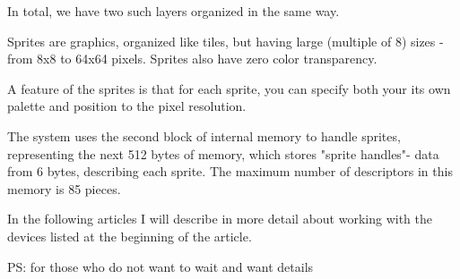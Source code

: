 In total, we have two such layers organized in the same way. 

Sprites are graphics, organized like tiles, but having large (multiple
of 8) sizes - from 8x8 to 64x64 pixels. Sprites also have zero color
transparency.

A feature of the sprites is that for each sprite, you can specify both
your its own palette and position to the pixel resolution.

The system uses the second block of internal memory to handle sprites,
representing the next 512 bytes of memory, which stores "sprite
handles"- data from 6 bytes, describing each sprite. The maximum
number of descriptors in this memory is 85 pieces.

In the following articles I will describe in more detail about working
with the devices listed at the beginning of the article.

PS: for those who do not want to wait and want details
